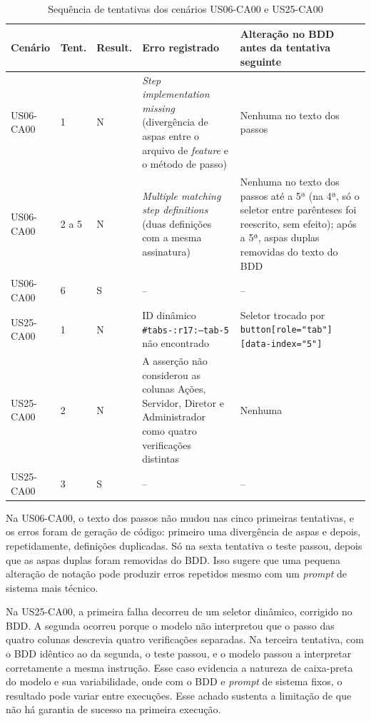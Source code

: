 \begin{table}[htb]
\centering
\footnotesize
\caption{Sequência de tentativas dos cenários US06-CA00 e US25-CA00}
\label{tab:casos}
\begin{tabular}{p{1.6cm}p{1.25cm}p{1.35cm}p{4.8cm}p{4.4cm}}
\hline
\textbf{Cenário} & \textbf{Tent.} & \textbf{Result.} & \textbf{Erro registrado} & \textbf{Alteração no BDD antes da tentativa seguinte} \\
\hline
US06-CA00 & 1 & N & \textit{Step implementation missing} (divergência de aspas entre o arquivo de \textit{feature} e o método de passo) & Nenhuma no texto dos passos \\
US06-CA00 & 2 a 5 & N & \textit{Multiple matching step definitions} (duas definições com a mesma assinatura) & Nenhuma no texto dos passos até a 5ª (na 4ª, só o seletor entre parênteses foi reescrito, sem efeito); após a 5ª, aspas duplas removidas do texto do BDD \\
US06-CA00 & 6 & S & -- & -- \\
\hline
US25-CA00 & 1 & N & ID dinâmico \texttt{\#tabs-:r17:--tab-5} não encontrado & Seletor trocado por \texttt{button[role="tab"]} \texttt{[data-index="5"]} \\
US25-CA00 & 2 & N & A asserção não considerou as colunas Ações, Servidor, Diretor e Administrador como quatro verificações distintas & Nenhuma \\
US25-CA00 & 3 & S & -- & -- \\
\hline
\end{tabular}
\end{table}

Na US06-CA00, o texto dos passos não mudou nas cinco primeiras tentativas, e os erros foram de geração de código: primeiro uma divergência de aspas e depois, repetidamente, definições duplicadas. Só na sexta tentativa o teste passou, depois que as aspas duplas foram removidas do BDD. Isso sugere que uma pequena alteração de notação pode produzir erros repetidos mesmo com um \textit{prompt} de sistema mais técnico.

Na US25-CA00, a primeira falha decorreu de um seletor dinâmico, corrigido no BDD. A segunda ocorreu porque o modelo não interpretou que o passo das quatro colunas descrevia quatro verificações separadas. Na terceira tentativa, com o BDD idêntico ao da segunda, o teste passou, e o modelo passou a interpretar corretamente a mesma instrução. Esse caso evidencia a natureza de caixa-preta do modelo e sua variabilidade, onde com o BDD e \textit{prompt} de sistema fixos, o resultado pode variar entre execuções. Esse achado sustenta a limitação de que não há garantia de sucesso na primeira execução.
